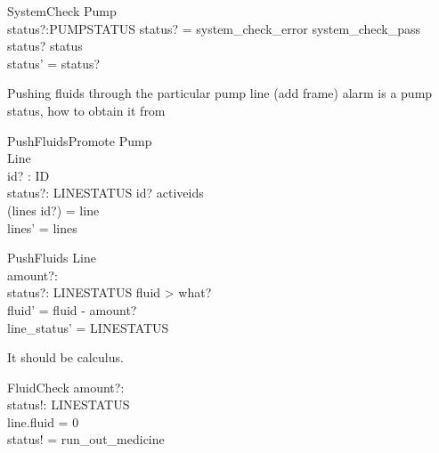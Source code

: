 \documentclass{article}
\begin{document}
	\begin{schema}{SystemCheck}
		\Delta Pump\\
		status?:PUMPSTATUS
	\where 
		status? = system\_check\_error \lor system\_check\_pass \\
		status? \neq status\\
		status' = status?
	\end{schema}
	
	Pushing fluids through the particular pump line (add frame) alarm is a pump status, how to obtain it from
	\begin{schema}{PushFluidsPromote}
		\Delta Pump	\\
		\Delta Line \\
		id? : ID \\
		status?: LINESTATUS
	\where 
		id? \in activeids \\
		(lines id?) = \theta line \\
		lines' = lines  \\		
	\end{schema}
	
	\begin{schema}{PushFluids}
		\Delta Line \\
		amount?: \nat \\
		status?: LINESTATUS
	\where 
		fluid > what? \\
		fluid' = fluid - amount? \\
		line_status' = LINESTATUS
	\end{schema}
	
	
	It should be calculus.
	\begin{schema}{FluidCheck}
		amount?: \nat \\
		status!: LINESTATUS \\
	\where 
		line.fluid = 0 \\
		status! = run\_out\_medicine \\
	\end{schema}	
		
\end{document}
